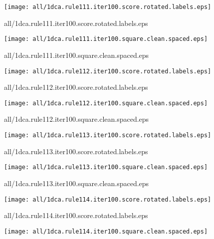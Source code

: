 \documentclass{article}
\begin{document}
\begin{center}
\begin{minipage}{\textwidth}
\texttt{[image: all/1dca.rule111.iter100.score.rotated.labels.eps]}
\end{minipage}
\end{center}
{\footnotesize all/1dca.rule111.iter100.score.rotated.labels.eps}
\begin{center}
\begin{minipage}{\textwidth}
\texttt{[image: all/1dca.rule111.iter100.square.clean.spaced.eps]}
\end{minipage}
\end{center}
{\footnotesize all/1dca.rule111.iter100.square.clean.spaced.eps}
\begin{center}
\begin{minipage}{\textwidth}
\texttt{[image: all/1dca.rule112.iter100.score.rotated.labels.eps]}
\end{minipage}
\end{center}
{\footnotesize all/1dca.rule112.iter100.score.rotated.labels.eps}
\begin{center}
\begin{minipage}{\textwidth}
\texttt{[image: all/1dca.rule112.iter100.square.clean.spaced.eps]}
\end{minipage}
\end{center}
{\footnotesize all/1dca.rule112.iter100.square.clean.spaced.eps}
\begin{center}
\begin{minipage}{\textwidth}
\texttt{[image: all/1dca.rule113.iter100.score.rotated.labels.eps]}
\end{minipage}
\end{center}
{\footnotesize all/1dca.rule113.iter100.score.rotated.labels.eps}
\begin{center}
\begin{minipage}{\textwidth}
\texttt{[image: all/1dca.rule113.iter100.square.clean.spaced.eps]}
\end{minipage}
\end{center}
{\footnotesize all/1dca.rule113.iter100.square.clean.spaced.eps}
\begin{center}
\begin{minipage}{\textwidth}
\texttt{[image: all/1dca.rule114.iter100.score.rotated.labels.eps]}
\end{minipage}
\end{center}
{\footnotesize all/1dca.rule114.iter100.score.rotated.labels.eps}
\begin{center}
\begin{minipage}{\textwidth}
\texttt{[image: all/1dca.rule114.iter100.square.clean.spaced.eps]}
\end{minipage}
\end{center}
\end{document}
